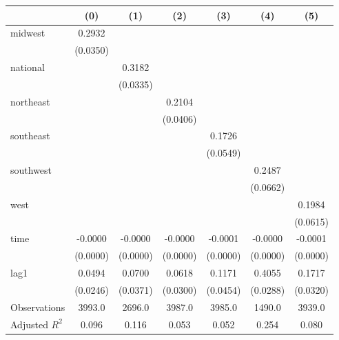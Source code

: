 \begin{tabular}{lcccccc}
\toprule
 & (0) & (1) & (2) & (3) & (4) & (5) \\
\midrule
midwest & 0.2932 &  &  &  &  &  \\
\vspace{0.2cm}
 & (0.0350) &  &  &  &  &  \\
national &  & 0.3182 &  &  &  &  \\
\vspace{0.2cm}
 &  & (0.0335) &  &  &  &  \\
northeast &  &  & 0.2104 &  &  &  \\
\vspace{0.2cm}
 &  &  & (0.0406) &  &  &  \\
southeast &  &  &  & 0.1726 &  &  \\
\vspace{0.2cm}
 &  &  &  & (0.0549) &  &  \\
southwest &  &  &  &  & 0.2487 &  \\
\vspace{0.2cm}
 &  &  &  &  & (0.0662) &  \\
west &  &  &  &  &  & 0.1984 \\
\vspace{0.2cm}
 &  &  &  &  &  & (0.0615) \\
time & -0.0000 & -0.0000 & -0.0000 & -0.0001 & -0.0000 & -0.0001 \\
\vspace{0.2cm}
 & (0.0000) & (0.0000) & (0.0000) & (0.0000) & (0.0000) & (0.0000) \\
lag1 & 0.0494 & 0.0700 & 0.0618 & 0.1171 & 0.4055 & 0.1717 \\
\vspace{0.2cm}
 & (0.0246) & (0.0371) & (0.0300) & (0.0454) & (0.0288) & (0.0320) \\
\midrule
Observations & 3993.0 & 2696.0 & 3987.0 & 3985.0 & 1490.0 & 3939.0 \\
Adjusted $R^2$ & 0.096 & 0.116 & 0.053 & 0.052 & 0.254 & 0.080 \\
\bottomrule
\end{tabular}